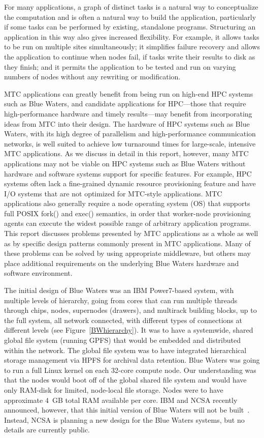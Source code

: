 \documentclass[10pt,letterpaper]{article}
\begin{document}
For many applications, a graph of distinct tasks is a natural way to
conceptualize the computation and is often a natural way to build
the application, particularly if some tasks can be performed by
existing, standalone programs.
Structuring an application in this way also gives
increased flexibility.  For example, it allows tasks to be run on multiple
sites simultaneously; it simplifies failure recovery and allows the application
to continue when nodes fail, if tasks write their
results to disk as they finish; and it permits the application to be tested and
run on varying numbers of nodes without any rewriting or modification.

MTC applications can greatly benefit from being run on high-end HPC systems
such as Blue Waters, and candidate applications for HPC---those that require
high-performance hardware and timely results---may benefit from incorporating
ideas from MTC into their design.
The hardware of HPC systems such as Blue Waters, with its high degree of
parallelism and high-performance communication networks, is well suited
to achieve low turnaround times for large-scale, intensive MTC applications.
As we discuss in detail in this report, however, many MTC applications may not
be viable on HPC systems such as Blue Waters
without hardware and software systems support for
specific features.  For example, HPC systems often lack a fine-grained dynamic resource
provisioning feature and have I/O systems that are not optimized for
MTC-style applications.
MTC applications also generally require a node operating system (OS)
that supports full POSIX fork() and exec() semantics, in order that worker-node provisioning agents can execute the widest possible range of arbitrary application programs.
This report discusses problems presented by
MTC applications as a whole as well as by specific design patterns commonly
present in MTC applications. Many of these problems can be solved by using
appropriate middleware, but others may place additional requirements on
the underlying Blue Waters hardware and software environment.

The initial design of Blue Waters was an IBM Power7-based system, with multiple levels
of hierarchy, going from cores that can run multiple threads through chips,
nodes, supernodes (drawers), and multirack building blocks, up to the full system,
all network connected, with different types of connections at different levels (see Figure~\ref{BWhierarchy}).
It was to have a systemwide, shared global file system (running GPFS) that would be embedded and distributed within
the network.  The global file system was to have integrated hierarchical storage management via HPFS for archival data retention.
Blue Waters was going to run a full Linux kernel on each 32-core compute node. Our understanding was that the nodes would boot off of the global shared file system and would have only RAM-disk for limited, node-local file storage. Nodes were to have approximate 4~GB total RAM available per core.  IBM and NCSA recently announced, however, that this initial version of Blue Waters will not be built~\cite{bw-Aug2011-announcement}. Instead, NCSA is planning a new design for the Blue Waters systems, but no details are currently public.
\end{document}
